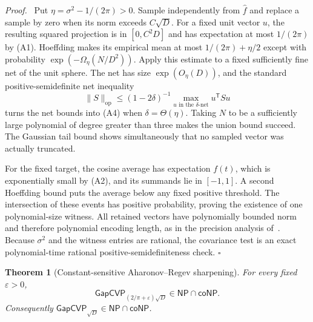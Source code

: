 \documentclass[11pt]{article}
\newtheorem{theorem}{Theorem}[section]
\newenvironment{proof}{\par\noindent\textit{Proof.}\ }{\hfill$\square$\par}
\newcommand{\GapCVP}{\mathsf{GapCVP}}
\begin{document}
\begin{proof}
Put $\eta=\sigma^2-1/(2\pi)>0$.  Sample independently from $\widehat f$ and
replace a sample by zero when its
norm exceeds $C\sqrt D$.  For a fixed unit vector $u$, the resulting squared
projection is in $[0,C^2D]$ and has expectation at most $1/(2\pi)$ by (A1).
Hoeffding makes its empirical mean at most $1/(2\pi)+\eta/2$ except with
probability $\exp(-\Omega_\eta(N/D^2))$.  Apply this estimate to a fixed
sufficiently fine net of the unit sphere.  The net has size
$\exp(O_\eta(D))$, and the standard positive-semidefinite net inequality
\[
  \|S\|_{\mathrm{op}}
  \le (1-2\delta)^{-1}
      \max_{u\text{ in the }\delta\text{-net}}u^{\mathsf T}Su
\]
turns the net bounds into (A4) when $\delta=\Theta(\eta)$.  Taking $N$ to be
a sufficiently large polynomial of degree greater than three makes the union
bound succeed.  The Gaussian tail bound shows simultaneously that no sampled
vector was actually truncated.

For the fixed target, the cosine average has expectation $f(t)$, which is
exponentially small by (A2), and its summands lie in $[-1,1]$.  A second
Hoeffding bound puts the average below any fixed positive threshold.  The
intersection of these events has positive probability, proving the existence
of one polynomial-size witness.  All retained vectors have polynomially
bounded norm and therefore polynomial encoding length, as in the precision
analysis of~\cite{AR05}.  Because $\sigma^2$ and the witness entries are
rational, the covariance test is an exact polynomial-time rational
positive-semidefiniteness check.
\end{proof}

\begin{theorem}[Constant-sensitive Aharonov--Regev sharpening]
\label{thm:arsharp}
For every fixed $\varepsilon>0$,
\[
  \GapCVP_{(2/\pi+\varepsilon)\sqrt D}
    \in\mathsf{NP}\cap\mathsf{coNP}.                    \tag{A5}
\]
Consequently $\GapCVP_{\sqrt D}\in\mathsf{NP}\cap\mathsf{coNP}$.
\end{theorem}
\end{document}
